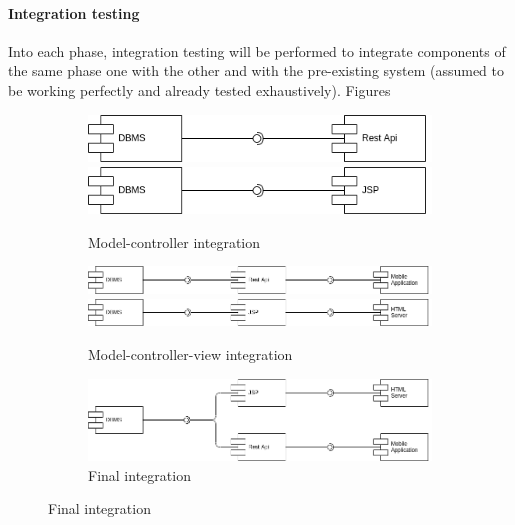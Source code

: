 \documentclass{article}
\begin{document}
\paragraph{Integration testing} Into each phase, integration testing will be performed to integrate components of the same phase one with the other and with the pre-existing system (assumed to be working perfectly and already tested exhaustively). Figures 
	\begin{figure}[h]
		\caption{Prototype integration}
		\label{fig:integrationPrototype}
		\centering
		\begin{subfigure}[H]{\linewidth}
			\includegraphics[width=.5\textwidth]{images/Integration_prototype_1.png}
			\includegraphics[width=.5\textwidth]{images/Integration_prototype_3.png}
			\caption{Model-controller integration}
		\end{subfigure}
		\begin{subfigure}[H]{\linewidth}
			\centering
			\includegraphics[width=\textwidth]{images/Integration_prototype_2.png}
			\includegraphics[width=\textwidth]{images/Integration_prototype_4.png}
			\caption{Model-controller-view integration}
		\end{subfigure}
		\begin{subfigure}[H]{\linewidth}
			\includegraphics[width=\textwidth]{images/Integration_prototype_5.png}
			\caption{Final integration}
		\end{subfigure}
	\end{figure}
\end{document}
